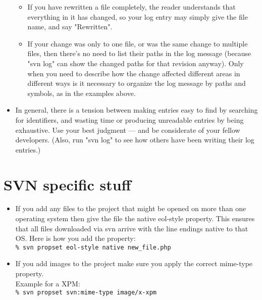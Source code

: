 \begin{itemize}
\begin{itemize}
        \item If you have rewritten a file completely, the reader understands
          that everything in it has changed, so your log entry may simply
          give the file name, and say "Rewritten".

        \item If your change was only to one file, or was the same change to
          multiple files, then there's no need to list their paths in the
          log message (because "svn log" can show the changed paths for
          that revision anyway).  Only when you need to describe how the
          change affected different areas in different ways is it
          necessary to organize the log message by paths and symbols, as
          in the examples above.
        \end{itemize}

    \item In general, there is a tension between making entries easy to find by
        searching for identifiers, and wasting time or producing unreadable
        entries by being exhaustive.  Use your best judgment --- and be
        considerate of your fellow developers.  (Also, run "svn log" to see
        how others have been writing their log entries.)
    \end{itemize}

\section{SVN specific stuff}
    \begin{itemize}
        \item If you add any files to the project that might be opened on more than one operating system then give the file
            the native eol-style property.  This ensures that all files downloaded via svn arrive with the line endings
            native to that OS.  Here is how you add the property:\\
            \texttt{\% svn propset eol-style native new\_file.php}

        \item If you add images to the project make sure you apply the correct  mime-type property.\\
            Example for a XPM:\\
            \texttt{\% svn propset svn:mime-type image/x-xpm}
    \end{itemize}



